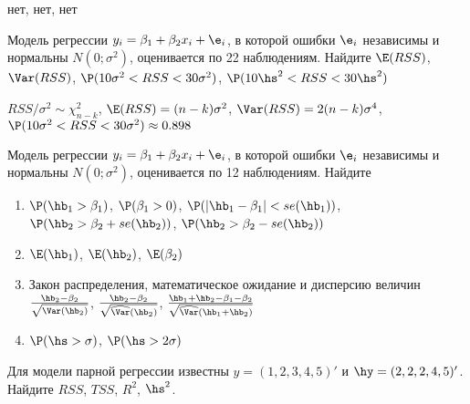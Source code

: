 \documentclass[pdftex,11pt,openany]{book}\usepackage[]{graphicx}\usepackage[]{color}
\begin{document}
\begin{solution}
нет, нет, нет
\end{solution}



\begin{problem}
 Модель регрессии $y_i = \beta_1 + \beta_2 x_i + \e_i$, в которой ошибки
$\e_i$ независимы и нормальны $N(0;\sigma^2)$, оценивается по 22 наблюдениям. Найдите $\E(RSS)$, $\Var(RSS)$, $\P(10\sigma^2<RSS<30\sigma^2)$, $\P(10\hs^2<RSS<30\hs^2)$
\end{problem}

\begin{solution}
 $RSS/\sigma^2\sim\chi^2_{n-k}$, $\E(RSS)=(n-k)\sigma^2$, $\Var(RSS)=2(n-k)\sigma^4$, $\P(10\sigma^2<RSS<30\sigma^2)\approx 0.898$
\end{solution}


\begin{problem}
 Модель регрессии $y_i = \beta_1 + \beta_2 x_i + \e_i$, в которой ошибки
$\e_i$ независимы и нормальны $N(0;\sigma^2)$, оценивается по 12 наблюдениям. Найдите
\begin{enumerate}
\item $\P(\hb_1>\beta_1)$, $\P(\beta_1>0)$, $\P(|\hb_1-\beta_1|<se(\hb_1))$, $\P(\hb_2>\beta_2+se(\hb_2))$, $\P(\hb_2>\beta_2-se(\hb_2))$
\item $\E(\hb_1)$, $\E(\hb_2)$, $\E(\beta_2)$
\item Закон распределения, математическое ожидание и дисперсию величин $\frac{\hb_2-\beta_2}{\sqrt{\Var(\hb_2)}}$, $\frac{\hb_2-\beta_2}{\sqrt{\widehat{\Var}(\hb_2)}}$, $\frac{\hb_1+\hb_2-\beta_1-\beta_2}{\sqrt{\widehat{\Var}(\hb_1+\hb_2)}}$
\item $\P(\hs>\sigma)$, $\P(\hs>2\sigma)$
\end{enumerate}

\end{problem}

\begin{solution}
\end{solution}



\begin{problem}
 Для модели парной регрессии известны $y=(1, 2, 3, 4, 5)'$ и $\hy=(2, 2, 2, 4, 5)'$. Найдите $RSS$, $TSS$, $R^2$, $\hs^2$.
\end{problem}

\begin{solution}
\end{solution}
\end{document}
